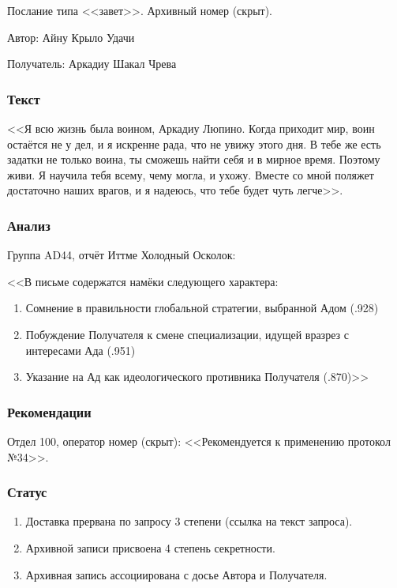 Послание типа <<завет>>. Архивный номер (скрыт).

Автор: Айну Крыло Удачи

Получатель: Аркадиу Шакал Чрева

\subsubsection{Текст}

<<Я всю жизнь была воином, Аркадиу Люпино.
Когда приходит мир, воин остаётся не у дел, и я искренне рада, что не увижу этого дня.
В тебе же есть задатки не только воина, ты сможешь найти себя и в мирное время.
Поэтому живи.
Я научила тебя всему, чему могла, и ухожу.
Вместе со мной поляжет достаточно наших врагов, и я надеюсь, что тебе будет чуть легче>>.

\subsubsection{Анализ}

Группа AD44, отчёт Иттме Холодный Осколок:

<<В письме содержатся намёки следующего характера:

\begin{enumerate}
\item Сомнение в правильности глобальной стратегии, выбранной Адом (.928)
\item Побуждение Получателя к смене специализации, идущей вразрез с интересами Ада (.951)
\item Указание на Ад как идеологического противника Получателя (.870)>>
\end{enumerate}

\subsubsection{Рекомендации}

Отдел 100, оператор номер (скрыт): <<Рекомендуется к применению протокол №34>>.

\subsubsection{Статус}

\begin{enumerate}
\item Доставка прервана по запросу 3 степени (ссылка на текст запроса).
\item Архивной записи присвоена 4 степень секретности.
\item Архивная запись ассоциирована с досье Автора и Получателя.
\end{enumerate}

